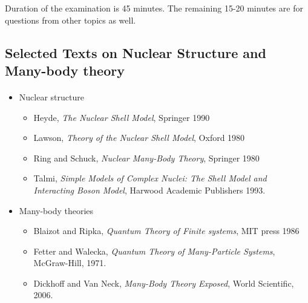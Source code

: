 \documentclass[%
twoside,                 %
final,                   %
10pt]{article}
\begin{document}
\noindent
Duration of the examination is 45 minutes. The remaining 15-20 minutes are for questions from other topics as well.




\subsection{Selected Texts on Nuclear Structure and Many-body theory}

\paragraph{}
\begin{itemize}
\item Nuclear structure
\begin{itemize}

 \item Heyde, \emph{The Nuclear Shell Model}, Springer 1990

 \item Lawson, \emph{Theory of the Nuclear Shell Model}, Oxford 1980

 \item Ring and Schuck, \emph{Nuclear Many-Body Theory}, Springer 1980

 \item Talmi, \emph{Simple Models of Complex Nuclei: The Shell Model and Interacting Boson Model}, Harwood Academic Publishers 1993.

\end{itemize}

\noindent
\item Many-body theories
\begin{itemize}

 \item Blaizot and Ripka, \emph{Quantum Theory of Finite systems}, MIT press 1986

 \item Fetter and Walecka, \emph{Quantum Theory of Many-Particle Systems}, McGraw-Hill, 1971.

 \item Dickhoff and Van Neck, \emph{Many-Body Theory Exposed}, World Scientific, 2006.
\end{itemize}

\noindent
\end{itemize}

\noindent
\end{document}

